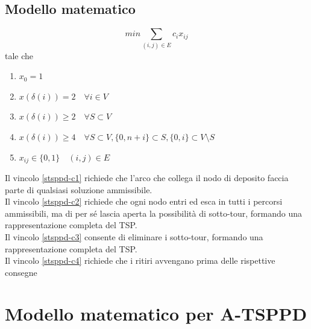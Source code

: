 \documentclass[9pt]{beamer}
\begin{document}
\subsection{Modello matematico}
\begin{frame}{\subsecname}

     	\[ min{ \sum_{(i,j) \in E} c_i x_{ij}} \]
	tale che
	\begin{enumerate}
		\item
		\label{stsppd-c1}
		$x_0 = 1$

		\item
		\label{stsppd-c2}
		$x(\delta(i)) = 2 \quad \forall i \in V$

		\item
		\label{stsppd-c3}
		$x(\delta(i)) \geq 2 \quad \forall S \subset V$
	
		\item
		\label{stsppd-c4}
		$x(\delta(i)) \geq 4 \quad \forall S \subset V, \{0, n+i\} \subset S, \{0,i\} \subset V \setminus S$

		\item
		$x_{ij} \in \{0,1\} \quad (i,j) \in E$
	\end{enumerate}
	
	\footnotesize
	Il vincolo \ref{stsppd-c1} richiede che l'arco che collega il nodo di deposito faccia parte di qualsiasi soluzione ammissibile. \\
	Il vincolo \ref{stsppd-c2} richiede che ogni nodo entri ed esca in tutti i percorsi ammissibili, ma di per sé lascia aperta la possibilità di sotto-tour, formando una rappresentazione completa del TSP. \\
	Il vincolo \ref{stsppd-c3} consente di eliminare i sotto-tour, formando una rappresentazione completa del TSP. \\
	Il vincolo \ref{stsppd-c4} richiede che i ritiri avvengano prima delle rispettive consegne

\end{frame}

\section{Modello matematico per A-TSPPD}
\end{document}

